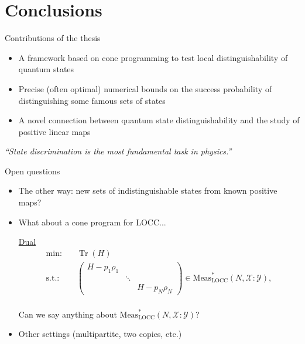 \documentclass{beamer}
\newcommand{\tr}{\operatorname{Tr}}
\def\X{\mathcal{X}}
\def\Y{\mathcal{Y}}
\newcommand{\setft}[1]{\mathrm{#1}}
\newcommand{\LOCC}{\setft{LOCC}}
\newcommand{\Meas}{\setft{Meas}}
\begin{document}
  \section{Conclusions}
    \begin{frame}{Contributions of the thesis}
        \begin{itemize}
         \itemsep2em
            \item A framework based on cone programming to test local distinguishability 
                of quantum states
            \item Precise (often optimal) numerical bounds on the success probability of 
                distinguishing some famous sets of states
            \item A novel connection between quantum state distinguishability and the study of 
                positive linear maps
        \end{itemize}
        \begin{exampleblock}{}
          {\large\emph{``State discrimination is the most fundamental task in physics.''}}
          \vskip5mm
          \hspace*{}
        \end{exampleblock}
    \end{frame}
        
      \begin{frame}{Open questions}
        \begin{itemize}
        \itemsep1em
          \item The other way: new sets of indistinguishable states from known positive maps?
          \item What about a cone program for LOCC... 
            \begin{center}
            \underline{Dual}
              \begin{equation*}
                \begin{split}
                  \text{min:} \quad & \tr(H)\\
                  \text{s.t.:}
                   \quad & 
                    \begin{pmatrix}
                        H - p_{1}\rho_{1} & & \\
                         & \ddots & \\
                         & & H - p_{N}\rho_{N}
                   \end{pmatrix}\in \boxed{\Meas_{\LOCC}^{\ast}(N, \X:\Y)},\\
                \end{split}
              \end{equation*}
            \end{center}
            Can we say anything about $\Meas_{\LOCC}^{\ast}(N, \X:\Y)$?
          \item Other settings (multipartite, two copies, etc.)
        \end{itemize}
    \end{frame}
\end{document}
